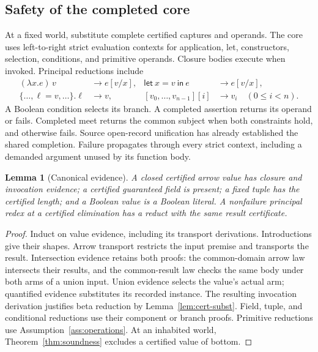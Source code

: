 \documentclass[10pt,a4paper]{article}
\newtheorem{lemma}[definition]{Lemma}
\theoremstyle{remark}
\begin{document}
\subsection{Safety of the completed core}
At a fixed world, substitute complete certified captures and operands. The
core uses left-to-right strict evaluation contexts for application, let,
constructors, selection, conditions, and primitive operands. Closure bodies
execute when invoked. Principal reductions include
\begin{align*}
 (\lambda x.e)\,v&\longrightarrow e[v/x],&
 \mathsf{let}\ x=v\ \mathsf{in}\ e&\longrightarrow e[v/x],\\
 \{\ldots,\ell=v,\ldots\}.\ell&\longrightarrow v,&
 [v_0,\ldots,v_{n-1}][i]&\longrightarrow v_i\quad(0\le i<n).
\end{align*}
A Boolean condition selects its branch. A completed assertion returns its
operand or fails. Completed meet returns the common subject when both
constraints hold, and otherwise fails. Source open-record unification has
already established the shared completion. Failure propagates through every
strict context, including a demanded argument unused by its function body.

\begin{lemma}[Canonical evidence]\label{lem:canonical}
A closed certified arrow value has closure and invocation evidence; a certified
guaranteed field is present; a fixed tuple has the certified length; and a
Boolean value is a Boolean literal. A nonfailure principal redex at a certified
elimination has a reduct with the same result certificate.
\end{lemma}
\begin{proof}
Induct on value evidence, including its transport derivations. Introductions
give their shapes. Arrow transport restricts the input premise and transports
the result. Intersection evidence retains both proofs: the common-domain arrow
law intersects their results, and the common-result law checks the same body
under both arms of a union input. Union evidence selects the value's actual
arm; quantified evidence substitutes its recorded instance. The resulting
invocation derivation justifies beta reduction by
Lemma~\ref{lem:cert-subst}. Field, tuple, and conditional reductions use their
component or branch proofs. Primitive reductions use
Assumption~\ref{ass:operations}. At an inhabited world,
Theorem~\ref{thm:soundness} excludes a certified value of bottom.
\end{proof}
\end{document}
